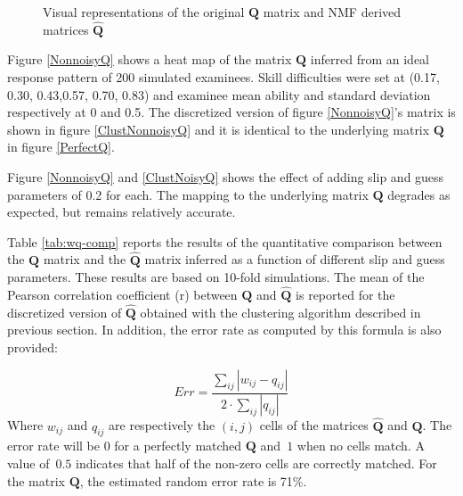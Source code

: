 \begin{figure}[!h]
\centering

\quad
\centering
{}\quad
\caption{Visual representations of the original $\mathbf{Q}$ matrix and NMF derived matrices $\hat{\mathbf{Q}}$}
\label{ClusteringResults}
\end{figure}


Figure \ref{NonnoisyQ} shows a heat map of the matrix $\mathbf{Q}$ inferred from an ideal response pattern of 200 simulated examinees. Skill difficulties were set at (0.17, 0.30, 0.43,0.57, 0.70, 0.83) and examinee mean ability and standard deviation respectively at 0 and 0.5. The discretized version of figure \ref{NonnoisyQ}\textquoteright{}s matrix is shown in figure \ref{ClustNonnoisyQ} and it is identical to the underlying matrix $\mathbf{Q}$ in figure \ref{PerfectQ}.

Figure \ref{NonnoisyQ} and \ref{ClustNoisyQ} shows the effect of adding slip and guess parameters of 0.2 for each. The mapping to the underlying matrix $\mathbf{Q}$ degrades as expected, but remains relatively accurate.

Table \ref{tab:wq-comp} reports the results of the quantitative comparison between the $\mathbf{Q}$ matrix and the $\hat{\mathbf{Q}}$ matrix inferred as a function of different slip and guess parameters. These results are based on 10-fold simulations. The mean of the Pearson correlation coefficient (r) between $\mathbf{Q}$ and $\hat{\mathbf{Q}}$ is reported for the discretized version of $\hat{\mathbf{Q}}$ obtained with the clustering algorithm described in previous section. In addition, the error rate as computed by this formula is also provided:

\begin{equation}
  Err = \frac{\sum_{ij} |w_{ij} - q_{ij}| }{2 \cdot \sum_{ij} |q_{ij}| }
\end{equation}
Where $w_{ij}$ and $q_{ij}$ are respectively the $(i,j)$ cells of the matrices $\hat{\mathbf{Q}}$ and $\mathbf{Q}$.  The error rate will be $0$ for a perfectly matched $\mathbf{Q}$ and~$1$ when no cells match.  A value of~$0.5$ indicates that half of the non-zero cells are correctly matched. For the matrix $\mathbf{Q}$, the estimated random error rate is 71\%.

